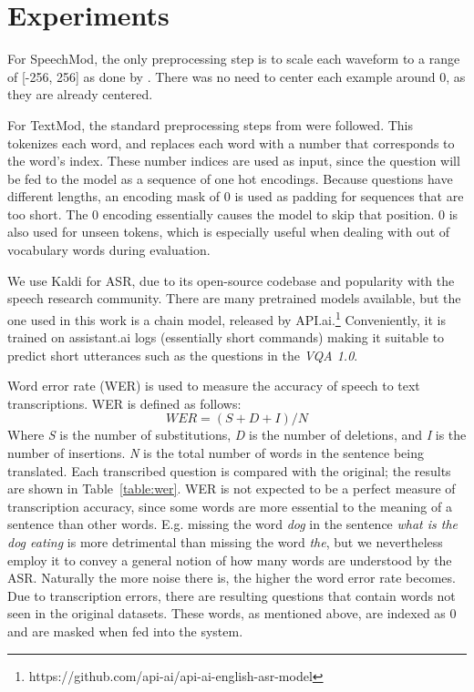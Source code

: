 \documentclass[letterpaper]{article} %
\begin{document}
\section{Experiments}
\label{sec:experiment}
For SpeechMod, the only preprocessing step is to scale each waveform to a range of [-256, 256] as done by . There was no need to center each example around 0, as they are already centered.

For TextMod, the standard preprocessing steps from  were followed. This tokenizes each word, and replaces each word with a number that corresponds to the word’s index. These number indices are used as input, since the question will be fed to the model as a sequence of one hot encodings. Because questions have different lengths, an encoding mask of 0 is used as padding for sequences that are too short. The 0 encoding essentially causes the model to skip that position. 0 is also used for unseen tokens, which is especially useful when dealing with out of vocabulary words during evaluation.

We use Kaldi  for ASR, due to its open-source codebase and popularity with the speech research community. There are many pretrained models available, but the one used in this work is a chain model, released by API.ai.\footnote{https://github.com/api-ai/api-ai-english-asr-model} Conveniently, it is trained on assistant.ai logs (essentially short commands) making it suitable to predict short utterances such as the questions in the \textit{VQA 1.0}.

Word error rate (WER) is used to measure the accuracy of speech to text transcriptions. WER is defined as follows: 
\begin{displaymath}
  \mathit{WER} = (S+D+I)/N
\end{displaymath}
Where \textit{S} is the number of substitutions, \textit{D} is the number of deletions, and \textit{I} is the number of insertions. \textit{N} is the total number of words in the sentence being translated. Each transcribed question is compared with the original; the results are shown in Table~\ref{table:wer}. WER is not expected to be a perfect measure of transcription accuracy, since some words are more essential to the meaning of a sentence than other words. E.g. missing the word \emph{dog} in the sentence \emph{what is the dog eating} is more detrimental than missing the word \emph{the}, but we nevertheless employ it to convey a general notion of how many words are understood by the ASR. Naturally the more noise there is, the higher the word error rate becomes. Due to transcription errors, there are resulting questions that contain words not seen in the original datasets. These words, as mentioned above, are indexed as 0 and are masked when fed into the system.
\end{document}
